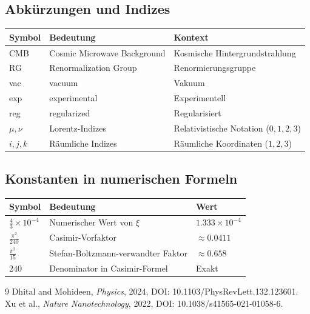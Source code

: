 	\subsection{Abkürzungen und Indizes}
	\begin{longtable}{p{2cm} p{8cm} p{3cm}}
		\toprule
		\textbf{Symbol} & \textbf{Bedeutung} & \textbf{Kontext} \\
		\midrule
		CMB & Cosmic Microwave Background & Kosmische Hintergrundstrahlung \\
		RG & Renormalization Group & Renormierungsgruppe \\
		vac & vacuum & Vakuum \\
		exp & experimental & Experimentell \\
		reg & regularized & Regularisiert \\
		$\mu, \nu$ & Lorentz-Indizes & Relativistische Notation ($0,1,2,3$) \\
		$i, j, k$ & Räumliche Indizes & Räumliche Koordinaten ($1,2,3$) \\
		\bottomrule
	\end{longtable}
	
	\subsection{Konstanten in numerischen Formeln}
	\begin{longtable}{p{2cm} p{8cm} p{3cm}}
		\toprule
		\textbf{Symbol} & \textbf{Bedeutung} & \textbf{Wert} \\
		\midrule
		$\frac{4}{3} \times 10^{-4}$ & Numerischer Wert von $\xi$ & $1.333 \times 10^{-4}$ \\
		$\frac{\pi^2}{240}$ & Casimir-Vorfaktor & $\approx 0.0411$ \\
		$\frac{\pi^2}{15}$ & Stefan-Boltzmann-verwandter Faktor & $\approx 0.658$ \\
		$240$ & Denominator in Casimir-Formel & Exakt \\
		\bottomrule
	\end{longtable}
		\begin{thebibliography}{9}
		Dhital and Mohideen, \emph{Physics}, 2024, DOI: 10.1103/PhysRevLett.132.123601.
		Xu et al., \emph{Nature Nanotechnology}, 2022, DOI: 10.1038/s41565-021-01058-6.
	\end{thebibliography}